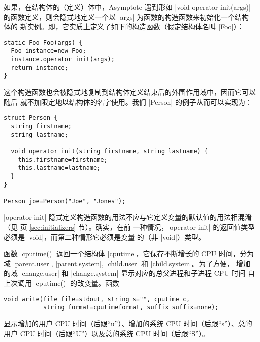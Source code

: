\documentclass{ctexbook}
\begin{document}
如果，在结构体的（定义）体中，Asymptote 遇到形如 |void operator init(args)|
的函数定义，则会隐式地定义一个以 |args| 为函数的构造函数来初始化一个结构体的
新实例。即，它实质上定义了如下的构造函数（假定结构体名叫 |Foo|）：
\begin{lstlisting}
static Foo Foo(args) {
  Foo instance=new Foo;
  instance.operator init(args);
  return instance;
}
\end{lstlisting}
\lstset{emph=}

这个构造函数也会被隐式地复制到结构体定义结束后的外围作用域中，因而它可以随后
就不加限定地以结构体的名字使用。我们 |Person| 的例子从而可以实现为：
\begin{lstlisting}
struct Person {
  string firstname;
  string lastname;

  void operator init(string firstname, string lastname) {
    this.firstname=firstname;
    this.lastname=lastname;
  }
}

Person joe=Person("Joe", "Jones");
\end{lstlisting}

|operator init| 隐式定义构造函数的用法不应与它定义变量的默认值的用法相混淆
（见 \pageref{sec:initializers} 页 \ref{sec:initializers} 节）。确实，在前
一种情况，|operator init| 的返回值类型必须是 |void|，而第二种情形它必须是变量
的（非 |void|）类型。

函数 |cputime()| 返回一个结构体 |cputime|，它保存不断增长的 CPU 时间，分为域
|parent.user|, |parent.system|, |child.user| 和 |child.system|。为了方便，
增加的域 |change.user| 和 |change.system| 显示对应的总父进程和子进程 CPU 时间
自上次调用 |cputime()| 的改变量。函数
\begin{lstlisting}
void write(file file=stdout, string s="", cputime c,
           string format=cputimeformat, suffix suffix=none);
\end{lstlisting}
显示增加的用户 CPU 时间（后跟“u”）、增加的系统 CPU 时间（后跟“s”）、总的
用户 CPU 时间（后跟“U”）以及总的系统 CPU 时间（后跟“S”）。
\end{document}
